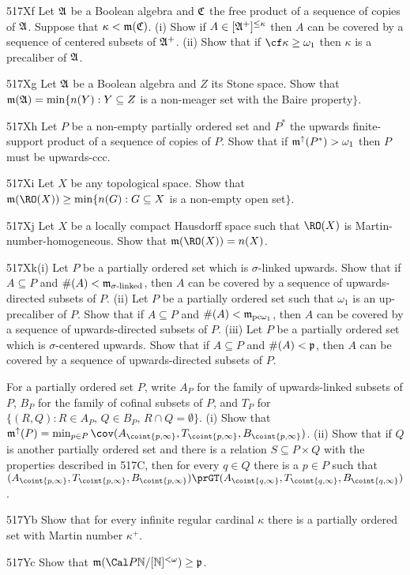 {\spheader 517Xf Let $\frak A$ be a Boolean algebra and $\frak C$ the
free product of a sequence of copies of $\frak A$.   Suppose that
$\kappa<\frak m(\frak C)$.   (i) Show if $A\in[\frak A^+]^{\le\kappa}$
then $A$ can be covered by a sequence of centered subsets of
$\frak A^+$.   (ii) Show that if $\cf\kappa\ge\omega_1$ then $\kappa$ is
a precaliber of $\frak A$.

\spheader 517Xg Let $\frak A$ be a Boolean algebra and $Z$ its Stone
space.   Show that $\frak m(\frak A)
=\min\{n(Y):Y\subseteq Z$ is a non-meager set with the
Baire property$\}$.

\sqheader 517Xh Let $P$ be a non-empty partially ordered set and $P^*$
the upwards finite-support product of a sequence of copies of $P$.
Show that if $\frak m^{\uparrow}(P^*)>\omega_1$ then $P$ must be
upwards-ccc.

\spheader 517Xi Let $X$ be any topological space.   Show that
$\frak m(\RO(X))\ge\min\{n(G):G\subseteq X$ is a non-empty open set$\}$.

\spheader 517Xj Let $X$ be a locally compact Hausdorff space such that
$\RO(X)$ is Martin-number-homogeneous.   Show that
$\frak m(\RO(X))=n(X)$.

\spheader 517Xk(i) Let $P$ be a partially ordered set which is
$\sigma$-linked upwards.   Show that if $A\subseteq P$ and
$\#(A)<\frak m_{\sigma\text{-linked}}$,
then $A$ can be covered by a sequence of
upwards-directed subsets of $P$.
(ii) Let $P$ be a partially ordered set such that $\omega_1$ is an
up-precaliber of $P$.   Show that if $A\subseteq P$ and
$\#(A)<\frak m_{\text{pc}\omega_1}$,
then $A$ can be covered by a sequence of
upwards-directed subsets of $P$.
(iii) Let $P$ be a partially ordered set which is
$\sigma$-centered upwards.   Show that if $A\subseteq P$ and
$\#(A)<\frak p$, then $A$ can be covered by a sequence of
upwards-directed subsets of $P$.

For a partially ordered set $P$,
write $A_P$ for the family of upwards-linked subsets of $P$, $B_P$ for
the family of cofinal subsets of $P$, and $T_P$ for
$\{(R,Q):R\in A_P,\,Q\in B_P,\,R\cap Q=\emptyset\}$.   (i) Show that
$\frak m^{\uparrow}(P)=\min_{p\in P}
\cov(A_{\coint{p,\infty}},T_{\coint{p,\infty}},B_{\coint{p,\infty}})$.
(ii) Show that if $Q$ is another partially ordered set and there is a
relation $S\subseteq P\times Q$ with the properties described in 517C,
then for every $q\in Q$ there is a $p\in P$ such that
$(A_{\coint{p,\infty}},T_{\coint{p,\infty}},B_{\coint{p,\infty}})
\prGT(A_{\coint{q,\infty}},T_{\coint{q,\infty}},B_{\coint{q,\infty}})$.

\spheader 517Yb Show that for every infinite regular
cardinal $\kappa$ there is a partially ordered set with Martin number
$\kappa^+$.

\spheader 517Yc Show that
$\frak m(\Cal P\Bbb N/[\Bbb N]^{<\omega})\ge\frak p$.
}%

